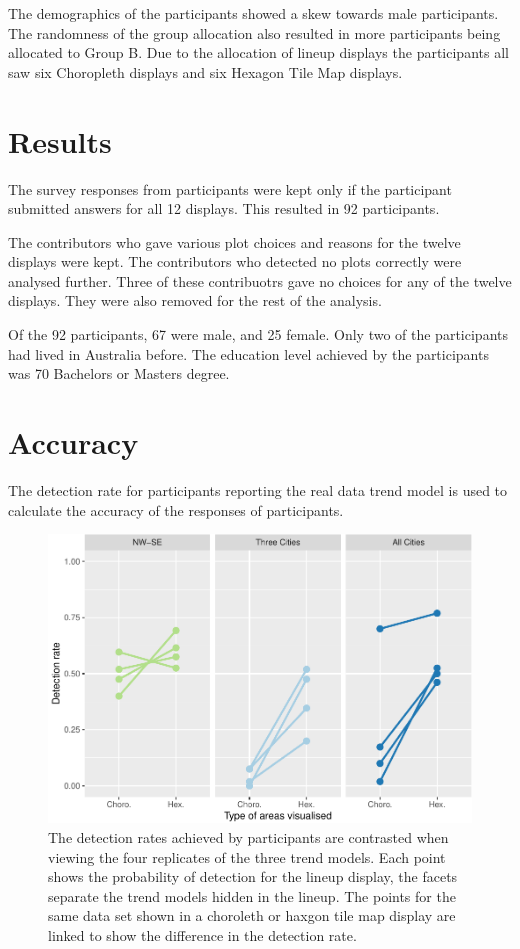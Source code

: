 \documentclass[conference,final,]{IEEEtran}
\makeatletter
\def\maxwidth{\ifdim\Gin@nat@width>\linewidth\linewidth
\else\Gin@nat@width\fi}
\let\Oldincludegraphics\includegraphics
\renewcommand{\includegraphics}[1]{\Oldincludegraphics[width=\maxwidth]{#1}}
\makeatother
\begin{document}
The demographics of the participants showed a skew towards male
participants. The randomness of the group allocation also resulted in
more participants being allocated to Group B. Due to the allocation of
lineup displays the participants all saw six Choropleth displays and six
Hexagon Tile Map displays.

\hypertarget{results}{%
\section{Results}\label{results}}

The survey responses from participants were kept only if the participant
submitted answers for all 12 displays. This resulted in 92 participants.

The contributors who gave various plot choices and reasons for the
twelve displays were kept. The contributors who detected no plots
correctly were analysed further. Three of these contribuotrs gave no
choices for any of the twelve displays. They were also removed for the
rest of the analysis.

Of the 92 participants, 67 were male, and 25 female. Only two of the
participants had lived in Australia before. The education level achieved
by the participants was 70 Bachelors or Masters degree.

\hypertarget{accuracy}{%
\section{Accuracy}\label{accuracy}}

The detection rate for participants reporting the real data trend model
is used to calculate the accuracy of the responses of participants.

\begin{figure}
\centering
\includegraphics{paper_files/figure-latex/detection_compare-1.pdf}
\caption{The detection rates achieved by participants are contrasted
when viewing the four replicates of the three trend models. Each point
shows the probability of detection for the lineup display, the facets
separate the trend models hidden in the lineup. The points for the same
data set shown in a choroleth or haxgon tile map display are linked to
show the difference in the detection rate.}
\end{figure}
\end{document}
